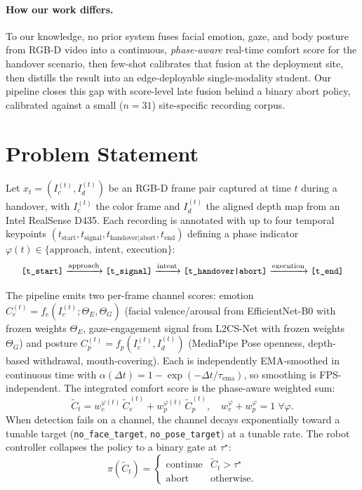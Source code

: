 \documentclass{article}
\newcommand{\code}[1]{\texttt{\small #1}}
\begin{document}
\paragraph{How our work differs.} To our knowledge, no prior system fuses facial emotion, gaze, and body posture from RGB-D video into a continuous, \emph{phase-aware} real-time comfort score for the handover scenario, then few-shot calibrates that fusion at the deployment site, then distills the result into an edge-deployable single-modality student. Our pipeline closes this gap with score-level late fusion behind a binary abort policy, calibrated against a small ($n=31$) site-specific recording corpus.

\section{Problem Statement}

Let $x_t = (I_c^{(t)}, I_d^{(t)})$ be an RGB-D frame pair captured at time $t$ during a handover, with $I_c^{(t)}$ the color frame and $I_d^{(t)}$ the aligned depth map from an Intel RealSense D435. Each recording is annotated with up to four temporal keypoints $(t_\text{start}, t_\text{signal}, t_\text{handover|abort}, t_\text{end})$ defining a phase indicator $\varphi(t) \in \{\text{approach, intent, execution}\}$:
\[
\code{[t\_start]} \xrightarrow{\text{approach}} \code{[t\_signal]} \xrightarrow{\text{intent}} \code{[t\_handover|abort]} \xrightarrow{\text{execution}} \code{[t\_end]}
\]

The pipeline emits two per-frame channel scores: emotion $C_e^{(t)} = f_e(I_c^{(t)}; \Theta_E, \Theta_G)$ (facial valence/arousal from EfficientNet-B0 with frozen weights $\Theta_E$, gaze-engagement signal from L2CS-Net with frozen weights $\Theta_G$) and posture $C_p^{(t)} = f_p(I_c^{(t)}, I_d^{(t)})$ (MediaPipe Pose openness, depth-based withdrawal, mouth-covering). Each is independently EMA-smoothed in continuous time with $\alpha(\Delta t) = 1 - \exp(-\Delta t / \tau_\text{ema})$, so smoothing is FPS-independent. The integrated comfort score is the phase-aware weighted sum:
\begin{equation}
\tilde{C}_t = w_e^{\varphi(t)}\,\tilde{C}_e^{(t)} + w_p^{\varphi(t)}\,\tilde{C}_p^{(t)},\quad w_e^\varphi + w_p^\varphi = 1\;\forall \varphi. \label{eq:fusion}
\end{equation}
When detection fails on a channel, the channel decays exponentially toward a tunable target (\code{no\_face\_target}, \code{no\_pose\_target}) at a tunable rate. The robot controller collapses the policy to a binary gate at $\tau^\star$:
\begin{equation}
\pi(\tilde{C}_t) = \begin{cases} \text{continue} & \tilde{C}_t > \tau^\star \\ \text{abort} & \text{otherwise}.\end{cases} \label{eq:policy}
\end{equation}
\end{document}
